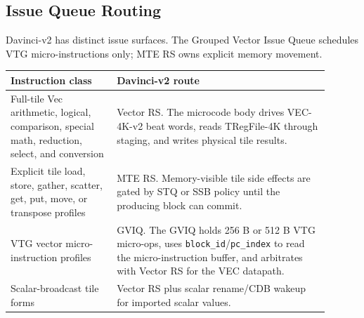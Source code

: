 \subsection{Issue Queue Routing}
Davinci-v2 has distinct issue surfaces. The Grouped Vector Issue Queue schedules VTG micro-instructions only; MTE RS owns explicit memory movement.
\begin{longtable}{@{}L{0.30\linewidth}L{0.60\linewidth}@{}}
\toprule
Instruction class & Davinci-v2 route \\
\midrule
Full-tile Vec arithmetic, logical, comparison, special math, reduction, select, and conversion & Vector RS. The microcode body drives VEC-4K-v2 beat words, reads TRegFile-4K through staging, and writes physical tile results. \\
Explicit tile load, store, gather, scatter, get, put, move, or transpose profiles & MTE RS. Memory-visible tile side effects are gated by STQ or SSB policy until the producing block can commit. \\
VTG vector micro-instruction profiles & GVIQ. The GVIQ holds 256 B or 512 B VTG micro-ops, uses \texttt{block\_id}/\texttt{pc\_index} to read the micro-instruction buffer, and arbitrates with Vector RS for the VEC datapath. \\
Scalar-broadcast tile forms & Vector RS plus scalar rename/CDB wakeup for imported scalar values. \\
\bottomrule
\end{longtable}


